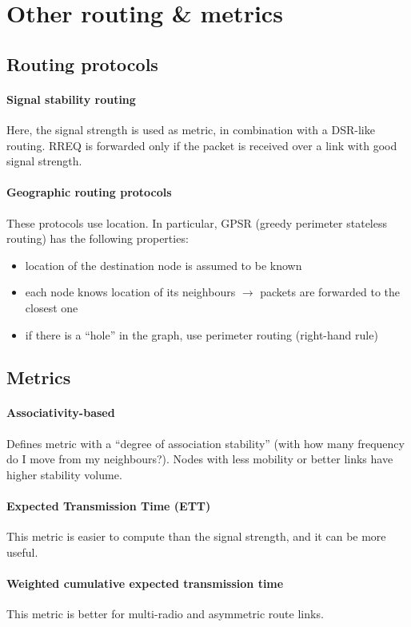 \section{Other routing \& metrics}

\subsection{Routing protocols}

\paragraph*{Signal stability routing} Here, the signal strength is used as
metric, in combination with a DSR-like routing. RREQ is forwarded only if the
packet is received over a link with good signal strength.

\paragraph*{Geographic routing protocols} These protocols use location. In
particular, GPSR (greedy perimeter stateless routing) has the following
properties:
\begin{itemize}
\item location of the destination node is assumed to be known
\item each node knows location of its neighbours $\to$ packets are forwarded to
  the closest one
\item if there is a ``hole'' in the graph, use perimeter routing (right-hand
rule) 
\end{itemize}

\subsection{Metrics}

\paragraph*{Associativity-based} 
Defines metric with a ``degree of association stability'' (with how many
frequency do I move from my neighbours?). Nodes with less mobility or better
links have higher stability volume.

\paragraph*{Expected Transmission Time (ETT)} This metric is easier to compute
than the signal strength, and it can be more useful.

\paragraph*{Weighted cumulative expected transmission time} This metric is
better for multi-radio and asymmetric route links.
